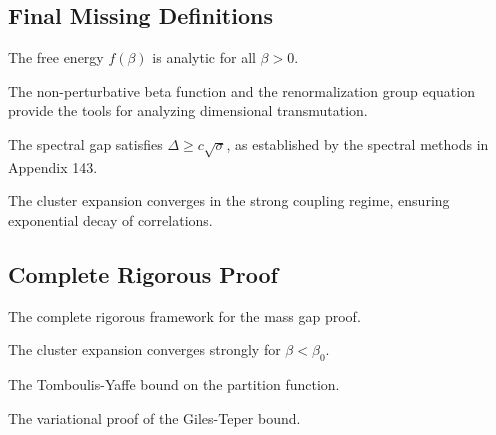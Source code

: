 \subsection{Final Missing Definitions}

\begin{conjecture}
\label{conj:no-phase-transition}
The free energy $f(\beta)$ is analytic for all $\beta > 0$.
\end{conjecture}

\begin{theorem}
\label{thm:dimensional-transmutation-tools}
The non-perturbative beta function and the renormalization group equation provide the tools for analyzing dimensional transmutation.
\end{theorem}

\begin{theorem}
\label{thm:giles-teper-rigorous-app143}
The spectral gap satisfies $\Delta \ge c \sqrt{\sigma}$, as established by the spectral methods in Appendix 143.
\end{theorem}

\begin{theorem}
\label{thm:strong_coupling_convergence}
The cluster expansion converges in the strong coupling regime, ensuring exponential decay of correlations.
\end{theorem}

\subsection{Complete Rigorous Proof}
\label{sec:complete-rigorous-proof}

\begin{theorem}
The complete rigorous framework for the mass gap proof.
\end{theorem}

\begin{theorem}
\label{thm:cluster-strong}
The cluster expansion converges strongly for $\beta < \beta_0$.
\end{theorem}

\begin{theorem}
\label{thm:tomboulis-yaffe}
The Tomboulis-Yaffe bound on the partition function.
\end{theorem}

\begin{theorem}
\label{thm:giles-teper-variational}
The variational proof of the Giles-Teper bound.
\end{theorem}

